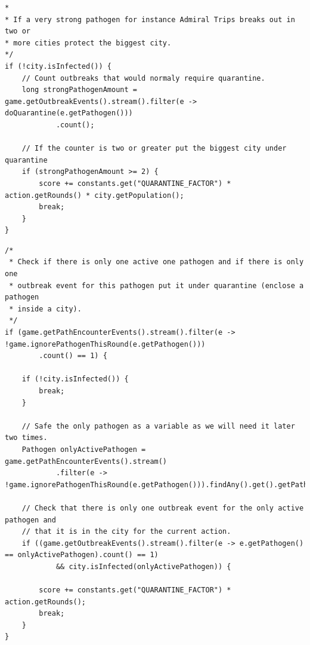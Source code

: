 \documentclass{article}
\begin{document}
\label{code:QuarantineForCity}
\begin{lstlisting}[title={Teil der Quarantäne Evaluation, welche bestimmt, ob die größte, uninfizierte Stadt vor mindestens zwei Ausbrüchen von starken Pathogenen geschützt werden muss}]
*
* If a very strong pathogen for instance Admiral Trips breaks out in two or
* more cities protect the biggest city.
*/
if (!city.isInfected()) {
	// Count outbreaks that would normaly require quarantine.
	long strongPathogenAmount = game.getOutbreakEvents().stream().filter(e -> doQuarantine(e.getPathogen()))
			.count();

	// If the counter is two or greater put the biggest city under quarantine
	if (strongPathogenAmount >= 2) {
		score += constants.get("QUARANTINE_FACTOR") * action.getRounds() * city.getPopulation();
		break;
	}
}
\end{lstlisting}

\label{code:QuarantineAtEnd}
\begin{lstlisting}[title={Teil der Quarantäne Evaluation, welche bestimmt, ob nur noch ein aktives Pathogen in einer Stadt existiert, welches sich nicht ausbreiten soll.}]
/*
 * Check if there is only one active one pathogen and if there is only one
 * outbreak event for this pathogen put it under quarantine (enclose a pathogen
 * inside a city).
 */
if (game.getPathEncounterEvents().stream().filter(e -> !game.ignorePathogenThisRound(e.getPathogen()))
		.count() == 1) {

	if (!city.isInfected()) {
		break;
	}

	// Safe the only pathogen as a variable as we will need it later two times.
	Pathogen onlyActivePathogen = game.getPathEncounterEvents().stream()
			.filter(e -> !game.ignorePathogenThisRound(e.getPathogen())).findAny().get().getPathogen();

	// Check that there is only one outbreak event for the only active pathogen and
	// that it is in the city for the current action.
	if ((game.getOutbreakEvents().stream().filter(e -> e.getPathogen() == onlyActivePathogen).count() == 1)
			&& city.isInfected(onlyActivePathogen)) {

		score += constants.get("QUARANTINE_FACTOR") * action.getRounds();
		break;
	}
}
\end{lstlisting}
\end{document}
